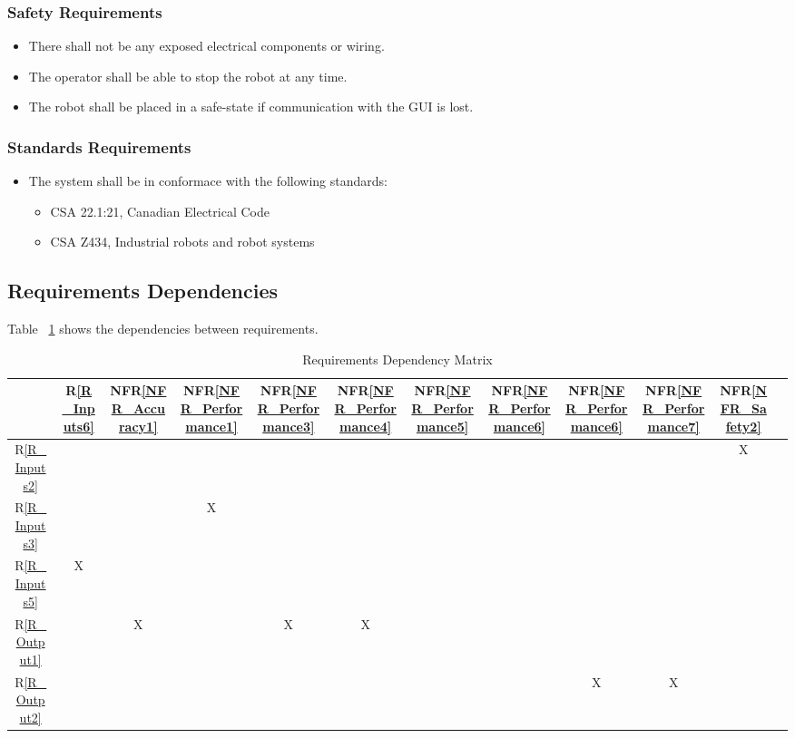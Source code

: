 \documentclass[12pt]{article}
\newcommand{\rref}[1]{R\ref{#1}}
\newcounter{nfrnum} %
\newcommand{\nfrref}[1]{NFR\ref{#1}}
\begin{document}
\subsubsection{Safety Requirements}
\noindent \begin{itemize}
\item[NFR\refstepcounter{nfrnum}\thenfrnum \label{NFR_Safety1}:] There shall not be any exposed electrical components or wiring.
\item[NFR\refstepcounter{nfrnum}\thenfrnum \label{NFR_Safety2}:] The operator shall be able to stop the robot at any time.
\item[NFR\refstepcounter{nfrnum}\thenfrnum \label{NFR_Safety3}:] The robot shall be placed in a safe-state if communication with the GUI is lost.
\end{itemize}

\subsubsection{Standards Requirements}
\noindent \begin{itemize}
\item[NFR\refstepcounter{nfrnum}\thenfrnum \label{NFR_Standard1}:] The system shall be in conformace with the following standards:
\begin{itemize}
\item CSA 22.1:21, Canadian Electrical Code \cite{CSA1}
\item CSA Z434, Industrial robots and robot systems \cite{CSA2}
\end{itemize}
\end{itemize}

\subsection{Requirements Dependencies}

Table ~\ref{Table:A_trace} shows the dependencies between requirements.

\begin{table}[H]
\centering
\caption{Requirements Dependency Matrix}
\begin{tabular}{|c|c|c|c|c|c|c|c|c|c|c|c|}
\hline
	& \rref{R_Inputs6}& \nfrref{NFR_Accuracy1}& \nfrref{NFR_Performance1}& \nfrref{NFR_Performance3}& \nfrref{NFR_Performance4}& \nfrref{NFR_Performance5}& \nfrref{NFR_Performance6}& \nfrref{NFR_Performance6}& \nfrref{NFR_Performance7}& \nfrref{NFR_Safety2} \\
\hline
\rref{R_Inputs2}      & & & & & & & & & &X\\ 
\hline
\rref{R_Inputs3}      & & &X & & & & & & &\\ 
\hline
\rref{R_Inputs5}      &X & & & & & & & & &\\  
\hline
\rref{R_Output1}      & &X & &X &X & & & & &\\ 
\hline
\rref{R_Output2}      & & & & & & & &X &X &\\ 
\hline
\end{tabular}

\label{Table:A_trace}
\end{table}
\end{document}

